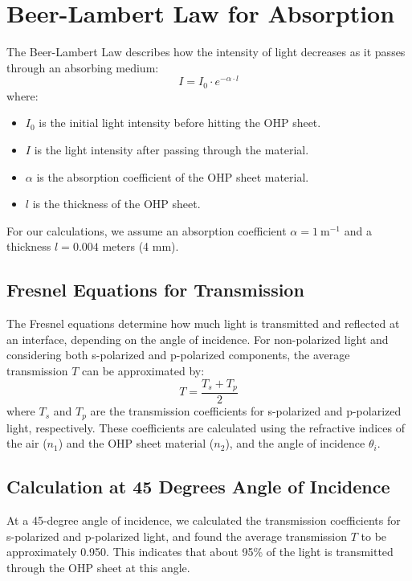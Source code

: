 \section{Beer-Lambert Law for Absorption} \label{sec:absorption}
The Beer-Lambert Law describes how the intensity of light decreases as it passes through an absorbing medium:
\[ I = I_0 \cdot e^{-\alpha \cdot l} \]
where:
\begin{itemize}
    \item \(I_0\) is the initial light intensity before hitting the OHP sheet.
    \item \(I\) is the light intensity after passing through the material.
    \item \(\alpha\) is the absorption coefficient of the OHP sheet material.
    \item \(l\) is the thickness of the OHP sheet.
\end{itemize}

For our calculations, we assume an absorption coefficient \(\alpha = 1\ \text{m}^{-1}\) and a thickness \(l = 0.004\) meters (4 mm).

\subsection*{Fresnel Equations for Transmission}
The Fresnel equations determine how much light is transmitted and reflected at an interface, depending on the angle of incidence. For non-polarized light and considering both s-polarized and p-polarized components, the average transmission \(T\) can be approximated by:
\[ T = \frac{T_s + T_p}{2} \]
where \(T_s\) and \(T_p\) are the transmission coefficients for s-polarized and p-polarized light, respectively. These coefficients are calculated using the refractive indices of the air (\(n_1\)) and the OHP sheet material (\(n_2\)), and the angle of incidence \(\theta_i\).

\subsection*{Calculation at 45 Degrees Angle of Incidence}
At a 45-degree angle of incidence, we calculated the transmission coefficients for s-polarized and p-polarized light, and found the average transmission \(T\) to be approximately 0.950. This indicates that about 95\% of the light is transmitted through the OHP sheet at this angle.

